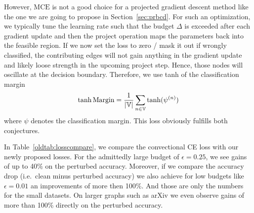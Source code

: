 \documentclass[sigconf,authordraft]{acmart}
\begin{document}
However, \(\text{MCE}\) is not a good choice for a projected gradient descent method like the one we are going to propose in Section~\ref{sec:prbcd}. For such an optimization, we typically tune the learning rate such that the budget \(\Delta\) is exceeded after each gradient update and then the project operation maps the parameters back into the feasible region. If we now set the loss to zero / mask it out if wrongly classified, the contributing edges will not gain anything in the gradient update and likely loose strength in the upcoming project step. Hence, those nodes will oscillate at the decision boundary. Therefore, we use tanh of the classification margin
\begin{equation}\label{oldeq:mce}
  \tanh\text{Margin} = \frac{1}{|{\mathbb{V}}|} \sum_{n \in {\mathbb{V}}} \tanh(\psi^{(n)})
\end{equation}
where \(\psi\) denotes the classification margin. This loss obviously fulfills both conjectures.

In Table~\ref{oldtab:losscompare}, we compare the convectional CE loss with our newly proposed losses. For the admittedly large budget of \(\epsilon=0.25\), we see gains of up to 40\% on the perturbed accuracy. Moreover, if we compare the accuracy drop (i.e.\ clean minus perturbed accuracy) we also achieve for low budgets like \(\epsilon=0.01\) an improvements of more then 100\%. And those are only the numbers for the small datasets. On larger graphs such as arXiv we even observe gains of more than 100\% directly on the perturbed accuracy.
\end{document}
